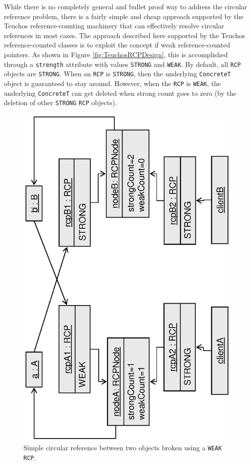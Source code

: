 \documentclass[pdf,ps2pdf,11pt]{SANDreport}
\begin{document}
While there is no completely general and bullet proof way to address
the circular reference problem, there is a fairly simple and cheap
approach supported by the Teuchos reference-counting machinery that
can effectively resolve circular references in most cases.  The
approach described here supported by the Teuchos reference-counted
classes is to exploit the concept if weak reference-counted pointers.
As shown in Figure {}\ref{fig:TeuchosRCPDesign}, this is accomplished
through a {}\texttt{strength} attribute with values {}\texttt{STRONG}
and {}\texttt{WEAK}.  By default, all {}\texttt{RCP} objects are
{}\texttt{STRONG}.  When an {}\texttt{RCP} is {}\texttt{STRONG}, then
the underlying {}\texttt{ConcreteT} object is guaranteed to stay
around.  However, when the {}\texttt{RCP} is {}\texttt{WEAK}, the
underlying {}\texttt{ConcreteT} can get deleted when strong count goes
to zero (by the deletion of other {}\texttt{STRONG} {}\texttt{RCP}
objects).

{\bsinglespace
\begin{figure}
\begin{center}
\includegraphics*[angle=270,scale=0.65]{CircularRCP_A_B_weak}
\end{center}
\caption{
\label{fig:CircularRCP_A_B_weak}
Simple circular reference between two objects broken using a
{}\texttt{WEAK} {}\texttt{RCP}.  }
\end{figure}
\esinglespace}
\end{document}
